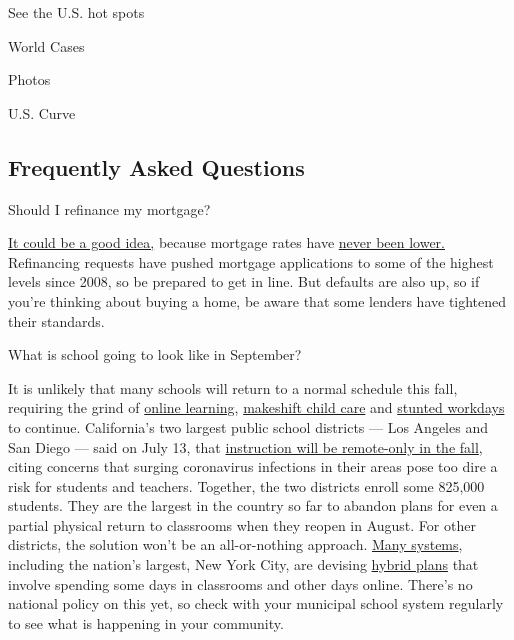 See the U.S. hot spots

World Cases

Photos

U.S. Curve

\hypertarget{frequently-asked-questions}{%
\subsection{Frequently Asked
Questions}\label{frequently-asked-questions}}

 Should I refinance my mortgage?

\href{https://www.nytimes3xbfgragh.onion/article/coronavirus-money-unemployment.html}{It
could be a good idea,} because mortgage rates have
\href{https://www.nytimes3xbfgragh.onion/2020/07/16/business/mortgage-rates-below-3-percent.html}{never
been lower.} Refinancing requests have pushed mortgage applications to
some of the highest levels since 2008, so be prepared to get in line.
But defaults are also up, so if you're thinking about buying a home, be
aware that some lenders have tightened their standards.

 What is school going to look like in September?

It is unlikely that many schools will return to a normal schedule this
fall, requiring the grind of
\href{https://www.nytimes3xbfgragh.onion/2020/06/05/us/coronavirus-education-lost-learning.html}{online
learning},
\href{https://www.nytimes3xbfgragh.onion/2020/05/29/us/coronavirus-child-care-centers.html}{makeshift
child care} and
\href{https://www.nytimes3xbfgragh.onion/2020/06/03/business/economy/coronavirus-working-women.html}{stunted
workdays} to continue. California's two largest public school districts
--- Los Angeles and San Diego --- said on July 13, that
\href{https://www.nytimes3xbfgragh.onion/2020/07/13/us/lausd-san-diego-school-reopening.html}{instruction
will be remote-only in the fall}, citing concerns that surging
coronavirus infections in their areas pose too dire a risk for students
and teachers. Together, the two districts enroll some 825,000 students.
They are the largest in the country so far to abandon plans for even a
partial physical return to classrooms when they reopen in August. For
other districts, the solution won't be an all-or-nothing approach.
\href{https://bioethics.jhu.edu/research-and-outreach/projects/eschool-initiative/school-policy-tracker/}{Many
systems}, including the nation's largest, New York City, are devising
\href{https://www.nytimes3xbfgragh.onion/2020/06/26/us/coronavirus-schools-reopen-fall.html}{hybrid
plans} that involve spending some days in classrooms and other days
online. There's no national policy on this yet, so check with your
municipal school system regularly to see what is happening in your
community.

